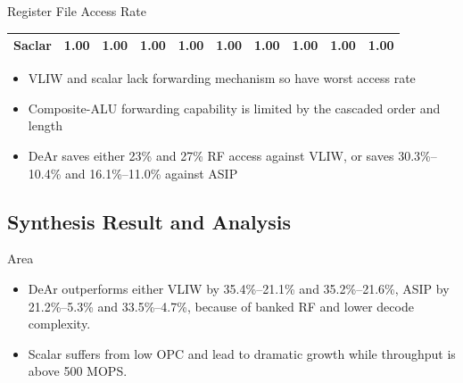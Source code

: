 \documentclass{beamer}
\begin{document}
\begin{CJK}{UTF8}{bkai}
\begin{frame}{Register File Access Rate}
\begin{table}[!ht]
{\begin{tabular}{|c|c|c|c|c|c|c|c|c|c|}
                            Saclar  &   1.00  &   1.00  &   1.00  &   1.00  &   1.00  &   1.00  &   1.00  &   1.00  &   1.00     \\ \hline 
                        \end{tabular}
                    }
                \end{table}
                \vspace{-1em}
                \begin{itemize}
                    \item <2->{VLIW and scalar lack forwarding mechanism so have worst access rate}
                    \item <3->{Composite-ALU forwarding capability is limited by the cascaded order and length}
                    \item <4->{DeAr saves either 23\% and 27\% RF access against VLIW,
                            or saves 30.3\%--10.4\% and 16.1\%--11.0\% against ASIP}
                \end{itemize}
            \end{frame}

            \subsection{Synthesis Result and Analysis}

            \begin{frame}{Area}
                \setcounter{subfigure}{0}
                \begin{figure}[t]
                    \begin{center}
                    \end{center}
                \end{figure}
                \begin{itemize}
                    \item <2->{DeAr outperforms either VLIW by 35.4\%--21.1\% and 35.2\%--21.6\%, 
                           ASIP by 21.2\%--5.3\% and 33.5\%--4.7\%, because of banked RF and lower decode complexity.}
                    \item <3->{Scalar suffers from low OPC and lead to dramatic growth while throughput is above 500 MOPS.}
                \end{itemize}
            \end{frame}


\end{CJK}
\end{document}
